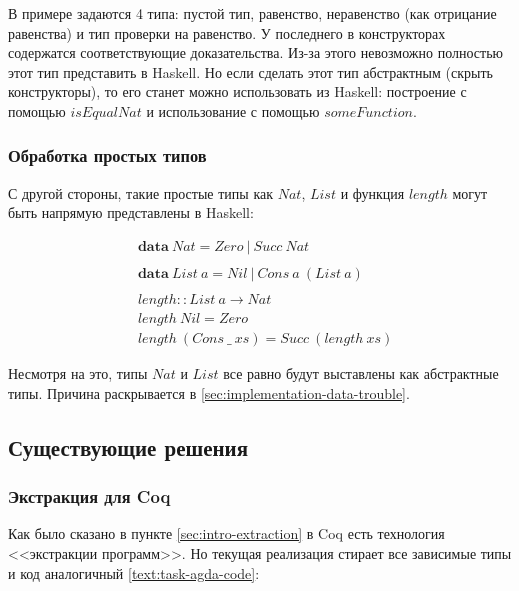 В примере задаются 4 типа: пустой тип, равенство, неравенство
(как отрицание равенства) и тип проверки на равенство. У последнего
в конструкторах содержатся соответствующие доказательства. Из-за этого
невозможно полностью этот тип представить в Haskell. Но если сделать этот
тип абстрактным (скрыть конструкторы), то его станет можно использовать из
Haskell: построение с помощью \(isEqualNat\) и использование с помощью
\(someFunction\).

\subsubsection{Обработка простых типов}

С другой стороны, такие простые типы как \(Nat\), \(List\) и
функция \(length\) могут быть напрямую представлены в Haskell:

\begin{align*}
&\mathbf{data}\ Nat = Zero\ |\ Succ\ Nat\\
\\
&\mathbf{data}\ List\ a = Nil\ |\ Cons\ a\ (List\ a)\\
\\
&length :: List\ a \rightarrow Nat\\
&length\ Nil = Zero\\
&length\ (Cons\ \_\ xs) = Succ\ (length\ xs)
\end{align*}

Несмотря на это, типы \(Nat\) и \(List\) все равно будут выставлены
как абстрактные типы. Причина раскрывается в \ref{sec:implementation-data-trouble}.

\subsection{Существующие решения}

\subsubsection{Экстракция для Coq}

Как было сказано в пункте \ref{sec:intro-extraction} в Coq есть технология
<<экстракции программ>>. Но текущая реализация стирает все зависимые типы и
код аналогичный \ref{text:task-agda-code}:

